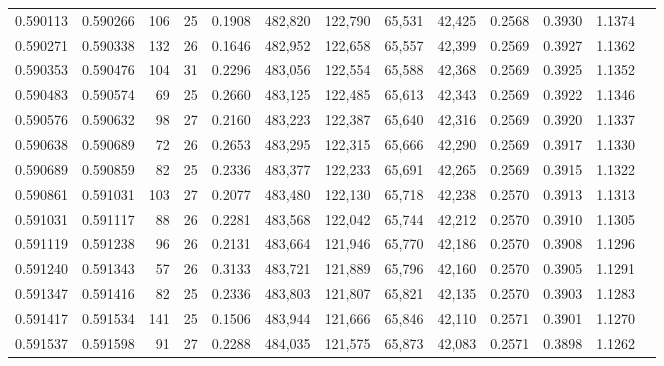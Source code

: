 \begin{tabular}{rrrrrrrrrrrrr}
0.590113 & 0.590266 & 106 &  25 &                                     0.1908 & 482,820 & 122,790 &  65,531 &  42,425 & 0.2568 & 0.3930 & 1.1374 \\
0.590271 & 0.590338 & 132 &  26 &                                     0.1646 & 482,952 & 122,658 &  65,557 &  42,399 & 0.2569 & 0.3927 & 1.1362 \\
0.590353 & 0.590476 & 104 &  31 &                                     0.2296 & 483,056 & 122,554 &  65,588 &  42,368 & 0.2569 & 0.3925 & 1.1352 \\
0.590483 & 0.590574 &  69 &  25 &                                     0.2660 & 483,125 & 122,485 &  65,613 &  42,343 & 0.2569 & 0.3922 & 1.1346 \\
0.590576 & 0.590632 &  98 &  27 &                                     0.2160 & 483,223 & 122,387 &  65,640 &  42,316 & 0.2569 & 0.3920 & 1.1337 \\
0.590638 & 0.590689 &  72 &  26 &                                     0.2653 & 483,295 & 122,315 &  65,666 &  42,290 & 0.2569 & 0.3917 & 1.1330 \\
0.590689 & 0.590859 &  82 &  25 &                                     0.2336 & 483,377 & 122,233 &  65,691 &  42,265 & 0.2569 & 0.3915 & 1.1322 \\
0.590861 & 0.591031 & 103 &  27 &                                     0.2077 & 483,480 & 122,130 &  65,718 &  42,238 & 0.2570 & 0.3913 & 1.1313 \\
0.591031 & 0.591117 &  88 &  26 &                                     0.2281 & 483,568 & 122,042 &  65,744 &  42,212 & 0.2570 & 0.3910 & 1.1305 \\
0.591119 & 0.591238 &  96 &  26 &                                     0.2131 & 483,664 & 121,946 &  65,770 &  42,186 & 0.2570 & 0.3908 & 1.1296 \\
0.591240 & 0.591343 &  57 &  26 &                                     0.3133 & 483,721 & 121,889 &  65,796 &  42,160 & 0.2570 & 0.3905 & 1.1291 \\
0.591347 & 0.591416 &  82 &  25 &                                     0.2336 & 483,803 & 121,807 &  65,821 &  42,135 & 0.2570 & 0.3903 & 1.1283 \\
0.591417 & 0.591534 & 141 &  25 &                                     0.1506 & 483,944 & 121,666 &  65,846 &  42,110 & 0.2571 & 0.3901 & 1.1270 \\
0.591537 & 0.591598 &  91 &  27 &                                     0.2288 & 484,035 & 121,575 &  65,873 &  42,083 & 0.2571 & 0.3898 & 1.1262 \\

\end{tabular}
